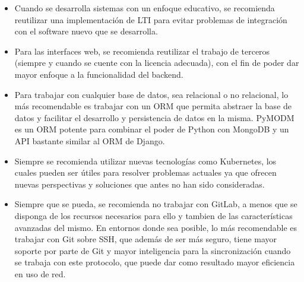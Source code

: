 \begin{itemize}
  \item Cuando se desarrolla sistemas con un enfoque educativo, se recomienda reutilizar una implementación de LTI para evitar problemas de integración con el software nuevo que se desarrolla.
  \item Para las interfaces web, se recomienda reutilizar el trabajo de terceros (siempre y cuando se cuente con la licencia adecuada), con el fin de poder dar mayor enfoque a la funcionalidad del backend.
  \item Para trabajar con cualquier base de datos, sea relacional o no relacional, lo más recomendable es trabajar con un ORM que permita abstraer la base de datos y facilitar el desarrollo y persistencia de datos en la misma. PyMODM es un ORM potente para combinar el poder de Python con MongoDB y un API bastante similar al ORM de Django.
  \item Siempre se recomienda utilizar nuevas tecnologías como Kubernetes, los cuales pueden ser útiles para resolver problemas actuales ya que ofrecen nuevas perspectivas y soluciones que antes no han sido consideradas.
  \item Siempre que se pueda, se recomienda no trabajar con GitLab, a menos que se disponga de los recursos necesarios para ello y tambien de las características avanzadas del mismo. En entornos donde sea posible, lo más recomendable es trabajar con Git sobre SSH, que además de ser más seguro, tiene mayor soporte por parte de Git y mayor inteligencia para la sincronización cuando se trabaja con este protocolo, que puede dar como resultado mayor eficiencia en uso de red.
\end{itemize}


